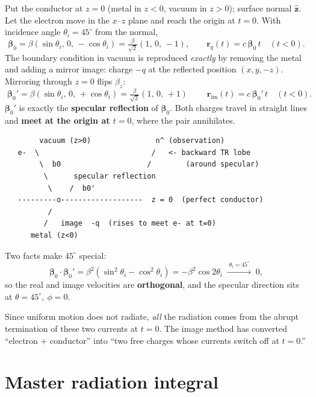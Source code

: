 \documentclass[11pt]{article}
\newcommand{\zhat}{\hat{\bm{z}}}
\newcommand{\bbeta}{\bm{\beta}}
\newcommand{\br}{\bm{r}}
\begin{document}
Put the conductor at $z=0$ (metal in $z<0$, vacuum in $z>0$); surface normal
$\zhat$. Let the electron move in the $x$--$z$ plane and reach the origin at
$t=0$. With incidence angle $\theta_i=45^\circ$ from the normal,
\begin{equation}
\bbeta_0=\beta(\sin\theta_i,\,0,\,-\cos\theta_i)
        =\tfrac{\beta}{\sqrt2}(1,\,0,\,-1),
\qquad
\br_q(t)=c\,\bbeta_0\,t\quad(t<0).
\end{equation}
The boundary condition in vacuum is reproduced \emph{exactly} by removing the
metal and adding a mirror image: charge $-q$ at the reflected position
$(x,y,-z)$. Mirroring through $z=0$ flips $\beta_z$:
\begin{equation}
\boxed{\;\bbeta_0'=\beta(\sin\theta_i,\,0,\,+\cos\theta_i)
        =\tfrac{\beta}{\sqrt2}(1,\,0,\,+1)\;}
\qquad
\br_{\mathrm{im}}(t)=c\,\bbeta_0'\,t\quad(t<0).
\end{equation}
$\bbeta_0'$ is exactly the \textbf{specular reflection} of $\bbeta_0$. Both
charges travel in straight lines and \textbf{meet at the origin at $t=0$},
where the pair annihilates.

\begin{verbatim}
        vacuum (z>0)               n^ (observation)
   e-  \                          /   <- backward TR lobe
        \  b0                    /        (around specular)
         \      specular reflection
          \    /  b0'
   ---------o-------------------  z = 0  (perfect conductor)
          /
         /   image  -q  (rises to meet e- at t=0)
      metal (z<0)
\end{verbatim}

Two facts make $45^\circ$ special:
\begin{equation}
\bbeta_0\cdot\bbeta_0'=\beta^2(\sin^2\theta_i-\cos^2\theta_i)
        =-\beta^2\cos2\theta_i
        \;\xrightarrow{\;\theta_i=45^\circ\;}\;0,
\end{equation}
so the real and image velocities are \textbf{orthogonal}, and the specular
direction sits at $\theta=45^\circ,\ \phi=0$.

Since uniform motion does not radiate, \emph{all} the radiation comes from the
abrupt termination of these two currents at $t=0$. The image method has
converted ``electron $+$ conductor'' into ``two free charges whose currents
switch off at $t=0$.''

\section{Master radiation integral}
\end{document}
